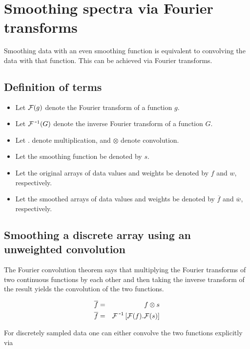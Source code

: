 \documentclass[12pt]{article}
\begin{document}
\def\pair{\stackrel{\mbox{\tiny FT}}{\Longleftrightarrow}}
\def\ft{{\cal F}}
\def\ift{{\cal F}^{\mbox{\,-}1}}
\parindent 0pt

\section{Smoothing spectra via Fourier transforms}

Smoothing data with an even smoothing function is equivalent to
convolving the data with that function. This can be achieved via
Fourier transforms.
 
\subsection{Definition of terms}

\begin{itemize}
\item Let $\ft(g)$ denote the Fourier transform of a function $g$.
\item Let $\ift(G)$ denote the inverse Fourier transform of a function $G$.
\item Let $.$ denote multiplication, and $\otimes$ denote convolution.
\item Let the smoothing function be denoted by $s$.
\item Let the original arrays of data values and weights be denoted by $f$ and $w$, respectively.
\item Let the smoothed arrays of data values and weights be denoted by $\overline{f}$ and $\overline{w}$, respectively.
\end{itemize}

\subsection{Smoothing a discrete array using an unweighted convolution}

The Fourier convolution theorem says that multiplying the Fourier
transforms of two continuous functions by each other and then taking
the inverse transform of the result yields the convolution of the two
functions.

\begin{eqnarray}
     \overline{f} &=& f \otimes s \\
%
     \label{convolve}
     \overline{f} &=& \ift\left[\ft(f).\ft(s)\right]
\end{eqnarray}

For discretely sampled data one can either convolve the two functions
explicitly via
\end{document}
